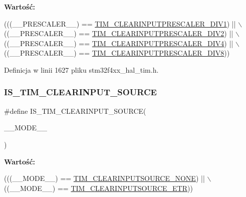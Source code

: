 {\bfseries Wartość\+:}
\begin{DoxyCode}
(((\_\_PRESCALER\_\_) == \hyperlink{group___t_i_m___clear_input___prescaler_gaf88d719dd5535b6b58275549c4512ec7}{TIM\_CLEARINPUTPRESCALER\_DIV1}) || \(\backslash\)
                                                    ((\_\_PRESCALER\_\_) == 
      \hyperlink{group___t_i_m___clear_input___prescaler_gae54b2f4ea04ef97f7c75755347edc8ba}{TIM\_CLEARINPUTPRESCALER\_DIV2}) || \(\backslash\)
                                                    ((\_\_PRESCALER\_\_) == 
      \hyperlink{group___t_i_m___clear_input___prescaler_gae3c3dea810bb9d83b532737f01a3213d}{TIM\_CLEARINPUTPRESCALER\_DIV4}) || \(\backslash\)
                                                    ((\_\_PRESCALER\_\_) == 
      \hyperlink{group___t_i_m___clear_input___prescaler_ga34bc6cb7ee8800cc48b1ee6c536859cc}{TIM\_CLEARINPUTPRESCALER\_DIV8}))
\end{DoxyCode}


Definicja w linii 1627 pliku stm32f4xx\+\_\+hal\+\_\+tim.\+h.

\mbox{\label{group___t_i_m___private___macros_ga2bfb55166b01cec552638c1af05a5c54}} 
\subsubsection{\texorpdfstring{I\+S\+\_\+\+T\+I\+M\+\_\+\+C\+L\+E\+A\+R\+I\+N\+P\+U\+T\+\_\+\+S\+O\+U\+R\+CE}{IS\_TIM\_CLEARINPUT\_SOURCE}}
{\footnotesize\ttfamily \#define I\+S\+\_\+\+T\+I\+M\+\_\+\+C\+L\+E\+A\+R\+I\+N\+P\+U\+T\+\_\+\+S\+O\+U\+R\+CE(\begin{DoxyParamCaption}\item[{}]{\+\_\+\+\_\+\+M\+O\+D\+E\+\_\+\+\_\+ }\end{DoxyParamCaption})}

{\bfseries Wartość\+:}
\begin{DoxyCode}
(((\_\_MODE\_\_) == \hyperlink{group___t_i_m___clear_input___source_ga48c5312aecd377fab00d62e9b4169e9e}{TIM\_CLEARINPUTSOURCE\_NONE})      || \(\backslash\)
                                             ((\_\_MODE\_\_) == 
      \hyperlink{group___t_i_m___clear_input___source_gaa28a8cf1db85cf6c845c6c1f02ba5c8e}{TIM\_CLEARINPUTSOURCE\_ETR}))
\end{DoxyCode}


